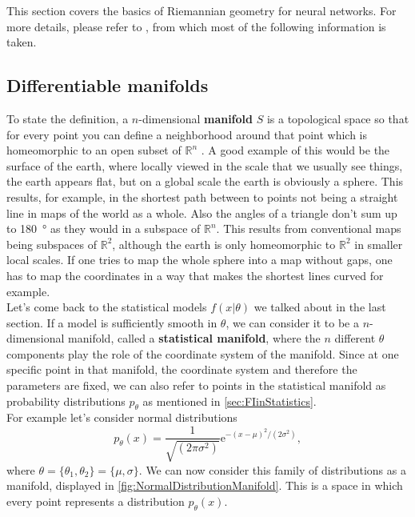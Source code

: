 This section covers the basics of Riemannian geometry for neural networks. For more details, please refer to \cite{AmarisLectureNotes}, from which most of the following information is taken.
\subsection{Differentiable manifolds}\label{sec:Manifolds}
To state the definition, a $n$-dimensional \textbf{manifold} $S$ is a topological space so that for every point you can define a neighborhood around that point which is homeomorphic to an open subset of $\mathbb{R}^n$ \cite{AmarisLectureNotes}. A good example of this would be the surface of the earth, where locally viewed in the scale that we usually see things, the earth appears flat, but on a global scale the earth is obviously a sphere. This results, for example, in the shortest path between to points not being a straight line in maps of the world as a whole. Also the angles of a triangle don't sum up to \SI{180}{\degree} as they would in a subspace of $\mathbb{R}^n$. This results from conventional maps being subspaces of $\mathbb{R}^2$, although the earth is only homeomorphic to $\mathbb{R}^2$ in smaller local scales. If one tries to map the whole sphere into a map without gaps, one has to map the coordinates in a way that makes the shortest lines curved for example.\\
Let's come back to the statistical models $f(x|\theta)$ we talked about in the last section. If a model is sufficiently smooth in $\theta$, we can consider it to be a $n$-dimensional manifold, called a \textbf{statistical manifold}, where the $n$ different $\theta$ components play the role of the coordinate system of the manifold. Since at one specific point in that manifold, the coordinate system and therefore the parameters are fixed, we can also refer to points in the statistical manifold as probability distributions $p_\theta$ as mentioned in \cref{sec:FIinStatistics}.\\
For example let's consider normal distributions \cite{AmarisLectureNotes}
\begin{equation}
	p_{\theta}(x) = \frac{1}{\sqrt{(2\pi\sigma^2)}} \mathrm{e}^{-(x-\mu)^2/(2\sigma^2)},
\end{equation}
where $\theta = \{\theta_1,\theta_2\} = \{\mu,\sigma\}$. We can now consider this family of distributions as a manifold, displayed in \cref{fig:NormalDistributionManifold}. This is a space in which every point represents a distribution $p_{\theta}(x)$.

